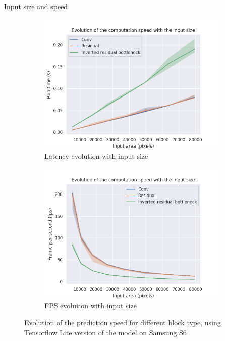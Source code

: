 \documentclass{beamer}
\begin{document}
\begin{frame}{Input size and speed}
    \begin{figure}
  \begin{center}
    \begin{subfigure}[t]{.49\linewidth}
      \centering
      \includegraphics[width=0.99\linewidth]{figures/speed_by_nn_size_and.png}
      \caption{Latency evolution with input size}
      \label{fig:latencysize}
    \end{subfigure}
    \begin{subfigure}[t]{.49\linewidth}
      \centering
      \includegraphics[width=0.99\linewidth]{figures/speed_by_nn_size_fps_and.png}
      \caption{FPS evolution with input size}
      \label{fig:fpssize}
    \end{subfigure}
    \caption{Evolution of the prediction speed for different block type, using Tensorflow Lite version of the model on Samsung S6}
    \label{resizeExample}
  \end{center}
\end{figure}
\end{frame}{}
\end{document}
